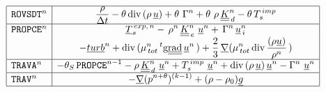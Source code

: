 \begin{equation}\label{Base_Predvv_tab_ext1}
\begin{array}{|l|c|}
\hline
\text{\texttt{ROVSDT}}^{n}
& \displaystyle
\frac{\rho}{\Delta t} -\theta \,\text{div}\, (\rho\,\underline{u}) +\theta \,\, \Gamma^n + \theta \,\, \rho\,\underline{\underline{K}}_{\,d}^n-\theta \,T_s^{\,imp} \\
\hline
\text{\texttt{PROPCE}}^{n}
& \displaystyle
\underline{T}_{s}^{\,exp,\,n}-\,\rho^{n}\,\underline{\underline{K}}_{\,e}^{n}\ \underline{u}^{n} + \,\Gamma^{n}\,\underline{u}_{\,i}^{n}\\
& \displaystyle
-\underline{turb}^{n}+ \text{div}\, (\mu_{\,tot}^{n}\,^t\text{g}\underline{\underline{\text{rad}}}\, \underline{u}^{n}\,)+ \frac {2} {3}\,\underline{\nabla} (\mu_{\,tot}^{n}\,\text{div}\, \frac{(\rho \underline{u})}{\rho^{n}}\,)\\
\hline
\text{\texttt{TRAVA}}^{n} &
\displaystyle
-\theta_S\,\text{\texttt{PROPCE}}^{n-1} -\rho\,\underline{\underline{K}}_{\,d}^n\ \underline{u}^{n} + T_s^{\,imp}\,\,\underline{u}^{n} + \text{div}\, (\rho\,\underline{u})\,\underline{u}^{n} - \Gamma^n\,\,\underline{u}^{n}\\
\hline
\text{\texttt{TRAV}}^{n}
& \displaystyle
- \underline{\nabla} (p^{n+\theta})^{(k-1)} + (\rho -\rho_0) \underline{g} \\
\hline
\end{array}
\end{equation}


